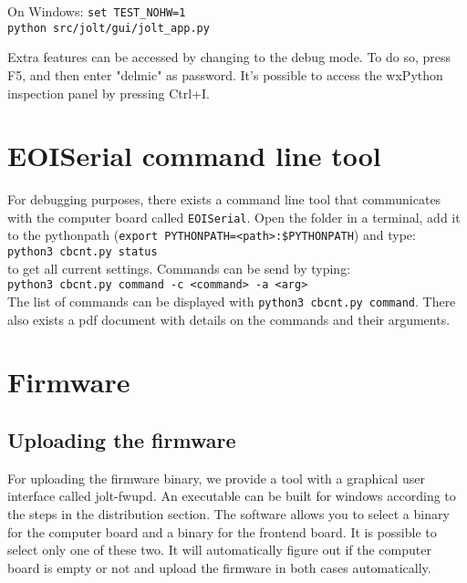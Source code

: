 \documentclass[]{article}
\begin{document}
On Windows:
\texttt{set TEST\_NOHW=1}\\
\texttt{python src/jolt/gui/jolt\_app.py}

Extra features can be accessed by changing to the debug mode. To do so, press F5, and then enter "delmic" as password.
It's possible to access the wxPython inspection panel by pressing Ctrl+I.

\section{EOISerial command line tool}
For debugging purposes, there exists a command line tool that communicates with the computer board called \texttt{EOISerial}. Open the folder in a terminal, add it to the pythonpath (\texttt{export PYTHONPATH=<path>:\$PYTHONPATH}) and type:\\
\texttt{python3 cbcnt.py status}\\
to get all current settings. Commands can be send by typing:\\
\texttt{python3 cbcnt.py command -c <command> -a <arg>}\\
The list of commands can be displayed with \texttt{python3 cbcnt.py command}.
There also exists a pdf document with details on the commands and their arguments.

\section{Firmware}

\subsection{Uploading the firmware}
For uploading the firmware binary, we provide a tool with a graphical user interface called jolt-fwupd. An executable can be built for windows according to the steps in the distribution section. The software allows you to select a binary for the computer board and a binary for the frontend board. It is possible to select only one of these two. It will automatically figure out if the computer board is empty or not and upload the firmware in both cases automatically.
\end{document}
